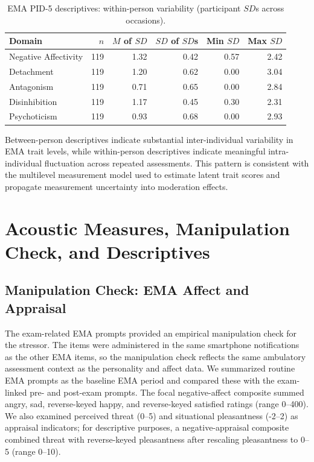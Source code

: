 \documentclass[
  english,
  man,floatsintext]{apa6}
\begin{document}
\begin{table}

\caption{\label{tab:table-s7-ema-within}EMA PID-5 descriptives: within-person variability (participant $SD$s across occasions).}
\centering
\begin{tabular}[t]{lrrrrr}
\toprule
Domain & $n$ & $M$ of $SD$ & $SD$ of $SD$s & Min $SD$ & Max $SD$\\
\midrule
Negative Affectivity & 119 & 1.32 & 0.42 & 0.57 & 2.42\\
Detachment & 119 & 1.20 & 0.62 & 0.00 & 3.04\\
Antagonism & 119 & 0.71 & 0.65 & 0.00 & 2.84\\
Disinhibition & 119 & 1.17 & 0.45 & 0.30 & 2.31\\
Psychoticism & 119 & 0.93 & 0.68 & 0.00 & 2.93\\
\bottomrule
\end{tabular}
\end{table}

Between-person descriptives indicate substantial inter-individual variability in EMA trait levels, while within-person descriptives indicate meaningful intra-individual fluctuation across repeated assessments. This pattern is consistent with the multilevel measurement model used to estimate latent trait scores and propagate measurement uncertainty into moderation effects.

\newpage

\section{Acoustic Measures, Manipulation Check, and Descriptives}\label{acoustic-measures-manipulation-check-and-descriptives}

\subsection{Manipulation Check: EMA Affect and Appraisal}\label{s-mc}

The exam-related EMA prompts provided an empirical manipulation check for the stressor. The items were administered in the same smartphone notifications as the other EMA items, so the manipulation check reflects the same ambulatory assessment context as the personality and affect data. We summarized routine EMA prompts as the baseline EMA period and compared these with the exam-linked pre- and post-exam prompts. The focal negative-affect composite summed angry, sad, reverse-keyed happy, and reverse-keyed satisfied ratings (range 0--400). We also examined perceived threat (0--5) and situational pleasantness (-2--2) as appraisal indicators; for descriptive purposes, a negative-appraisal composite combined threat with reverse-keyed pleasantness after rescaling pleasantness to 0--5 (range 0--10).
\end{document}
